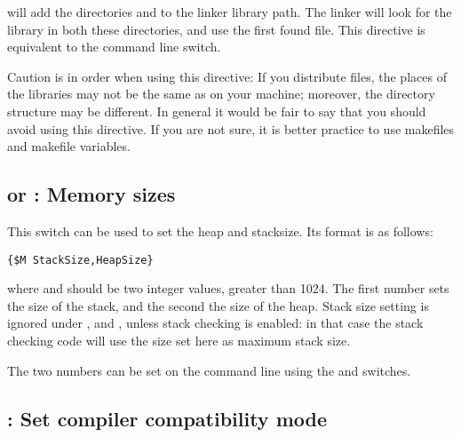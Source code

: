 will add the directories  and  to
the linker library path. The linker will look for the library 
in both these directories, and use the first found file. This directive is
equivalent to the  command line switch.

Caution is in order when using this directive: If you distribute files, the
places of the libraries may not be the same as on your machine; moreover, the
directory structure may be different. In general it would be fair to say
that you should avoid using this directive. If you are not sure, it is better
practice to use makefiles and makefile variables.

\subsection{ or  : Memory sizes}

This switch can be used to set the heap and stacksize. Its format is as
follows:
\begin{verbatim}
{$M StackSize,HeapSize}
\end{verbatim}
where  and  should be two integer values,
greater than 1024. The first number sets the size of the stack, and the
second the size of the heap. Stack size setting is ignored under \linux, 
\netbsd and \freebsd, unless stack checking is enabled: in that case the
stack checking code will use the size set here as maximum stack size.

The two numbers can be set on the command line using the 
and  switches.

\subsection{ : Set compiler compatibility mode}

